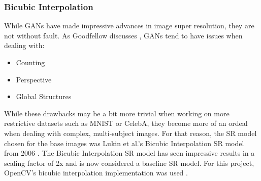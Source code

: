 \subsubsection{Bicubic Interpolation}
While GANs have made impressive advances in image super resolution, they are not
without fault. As Goodfellow discusses \cite{Goodfellow2017}, GANs tend to have
issues when dealing with:

\begin{itemize}
	\item Counting
	\item Perspective
	\item Global Structures
\end{itemize}

While these drawbacks may be a bit more trivial when working on more restrictive
datasets such as MNIST or CelebA, they become more of an ordeal when dealing
with complex, multi-subject images. For that reason, the SR model chosen for the
base images was Lukin et al.’s Bicubic Interpolation SR model from 2006
\cite{Lukin2006}. The Bicubic Interpolation SR model has seen impressive results in a scaling
factor of 2x and is now considered a baseline SR model. For this project,
OpenCV’s bicubic interpolation implementation was used \cite{Bradski2000}.
